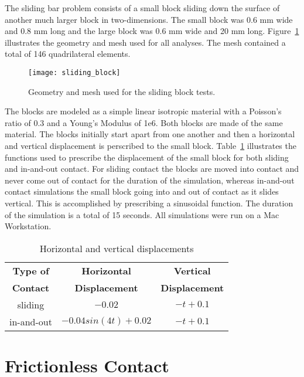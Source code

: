 \documentclass[]{article}
\begin{document}
The sliding bar problem consists of a small block sliding down the surface of another much larger block in two-dimensions.  The small block was 0.6 mm wide and 0.8 mm long and the large block was 0.6 mm wide and 20 mm long.  Figure~\ref{fig:sliding_block} illustrates the geometry and mesh used for all analyses.  The mesh contained a total of 146 quadrilateral elements.

\begin{figure}[H]
   \centering
   \texttt{[image: sliding\_block]}
   \caption{Geometry and mesh used for the sliding block tests.}
   \label{fig:sliding_block}
\end{figure}

\noindent The blocks are modeled as a simple linear isotropic material with a Poisson's ratio of 0.3 and a Young's Modulus of 1e6.  Both blocks are made of the same material.  The blocks initially start apart from one another and then a horizontal and vertical displacement is perscribed to the small block.  Table~\ref{table:displacements} illustrates the functions used to prescribe the displacement of the small block for both sliding and in-and-out contact.  For sliding contact the blocks are moved into contact and never come out of contact for the duration of the simulation, whereas in-and-out contact simulations the small block going into and out of contact as it slides vertical.  This is accomplished by prescribing a sinusoidal function. The duration of the simulation is a total of 15 seconds.  All simulations were run on a Mac Workstation.

\begin{table}[!ht]
\caption{Horizontal and vertical displacements}
\centering
\begin{tabular}{ccc}
\hline
\textbf{Type of} & \textbf{Horizontal} & \textbf{Vertical} \\
\textbf{Contact}  & \textbf{Displacement} & \textbf{Displacement}\\
\hline
sliding & $ -0.02 $ & $ -t + 0.1 $ \\
in-and-out & $ -0.04sin(4t)+0.02 $& $ -t + 0.1$ \\
\hline
\end{tabular}
\label{table:displacements}
\end{table}

\section{Frictionless Contact}
\label{frictionless_contact}
\end{document}
